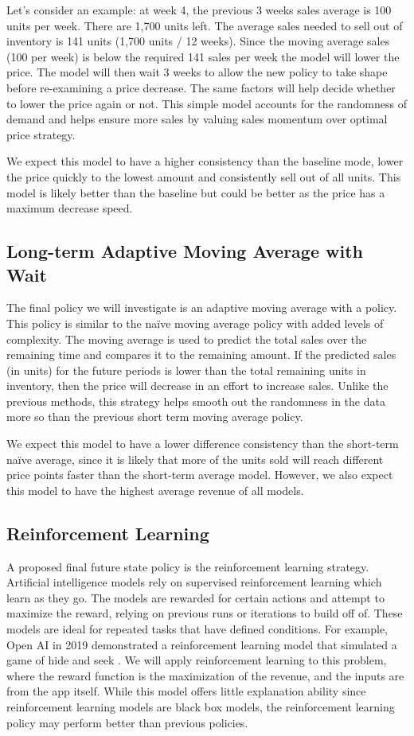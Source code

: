 \documentclass[11pt,a4paper]{article}
\begin{document}
Let’s consider an example: at week 4, the previous 3 weeks sales average is 100 units per week. There are 1,700 units left. 
The average sales needed to sell out of inventory is 141 units (1,700 units / 12 weeks). 
Since the moving average sales (100 per week) is below the required 141 sales per week the model will lower the price. 
The model will then wait 3 weeks to allow the new policy to take shape before re-examining a price decrease. 
The same factors will help decide whether to lower the price again or not. 
This simple model accounts for the randomness of demand and helps ensure more sales by valuing sales momentum over optimal price strategy.

We expect this model to have a higher consistency than the baseline mode, lower the price quickly to the lowest amount and consistently sell out of all units.  
This model is likely better than the baseline but could be better as the price has a maximum decrease speed.

\subsection{Long-term Adaptive Moving Average with Wait}
The final policy we will investigate is an adaptive moving average with a policy. 
This policy is similar to the naïve moving average policy with added levels of complexity. 
The moving average is used to predict the total sales over the remaining time and compares it to the remaining amount. 
If the predicted sales (in units) for the future periods is lower than the total remaining units in inventory, then the price will decrease in an effort to increase sales. 
Unlike the previous methods, this strategy helps smooth out the randomness in the data more so than the previous short term moving average policy. 

We expect this model to have a lower difference consistency than the short-term naïve average, since it is likely that more of the units sold will reach different price points faster than the short-term average model. 
However, we also expect this model to have the highest average revenue of all models.

\subsection{Reinforcement Learning}
A proposed final future state policy is the reinforcement learning strategy. 
Artificial intelligence models rely on supervised reinforcement learning which learn as they go. 
The models are rewarded for certain actions and attempt to maximize the reward, relying on previous runs or iterations to build off of. 
These models are ideal for repeated tasks that have defined conditions. For example, Open AI in 2019 demonstrated a reinforcement learning model that simulated a game of hide and seek \cite{baker2019emergent}. 
We will apply reinforcement learning to this problem, where the reward function is the maximization of the revenue, and the inputs are from the app itself. 
While this model offers little explanation ability since reinforcement learning models are black box models, the reinforcement learning policy may perform better than previous policies.
\end{document}
